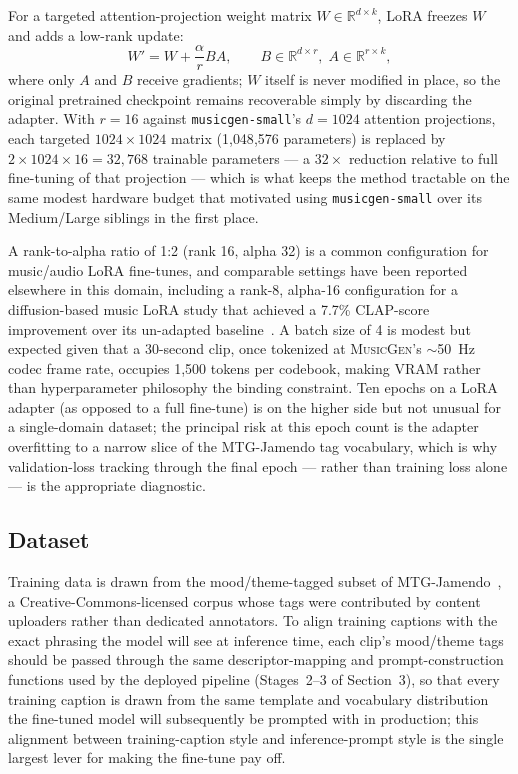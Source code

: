 \documentclass[11pt]{article}
\newcommand{\musicgen}{\textsc{MusicGen}}
\begin{document}
For a targeted attention-projection weight matrix $W \in \mathbb{R}^{d \times k}$, LoRA freezes $W$ and adds a low-rank update:
\begin{equation}
W' = W + \frac{\alpha}{r} B A, \qquad B \in \mathbb{R}^{d \times r},\; A \in \mathbb{R}^{r \times k},
\label{eq:lora}
\end{equation}
where only $A$ and $B$ receive gradients; $W$ itself is never modified in place, so the original pretrained checkpoint remains recoverable simply by discarding the adapter. With $r=16$ against \texttt{musicgen-small}'s $d=1024$ attention projections, each targeted $1024 \times 1024$ matrix (1{,}048{,}576 parameters) is replaced by $2 \times 1024 \times 16 = 32{,}768$ trainable parameters --- a $32\times$ reduction relative to full fine-tuning of that projection --- which is what keeps the method tractable on the same modest hardware budget that motivated using \texttt{musicgen-small} over its Medium/Large siblings in the first place.

A rank-to-alpha ratio of 1:2 (rank 16, alpha 32) is a common configuration for music/audio LoRA fine-tunes, and comparable settings have been reported elsewhere in this domain, including a rank-8, alpha-16 configuration for a diffusion-based music LoRA study that achieved a 7.7\% CLAP-score improvement over its un-adapted baseline~\cite{kim2025loradiffusion}. A batch size of 4 is modest but expected given that a 30-second clip, once tokenized at \musicgen{}'s $\sim$50~Hz codec frame rate, occupies 1{,}500 tokens per codebook, making VRAM rather than hyperparameter philosophy the binding constraint. Ten epochs on a LoRA adapter (as opposed to a full fine-tune) is on the higher side but not unusual for a single-domain dataset; the principal risk at this epoch count is the adapter overfitting to a narrow slice of the MTG-Jamendo tag vocabulary, which is why validation-loss tracking through the final epoch --- rather than training loss alone --- is the appropriate diagnostic.

\subsection{Dataset}

Training data is drawn from the mood/theme-tagged subset of MTG-Jamendo~\cite{bogdanov2019jamendo}, a Creative-Commons-licensed corpus whose tags were contributed by content uploaders rather than dedicated annotators. To align training captions with the exact phrasing the model will see at inference time, each clip's mood/theme tags should be passed through the same descriptor-mapping and prompt-construction functions used by the deployed pipeline (Stages~2--3 of Section~3), so that every training caption is drawn from the same template and vocabulary distribution the fine-tuned model will subsequently be prompted with in production; this alignment between training-caption style and inference-prompt style is the single largest lever for making the fine-tune pay off.
\end{document}
